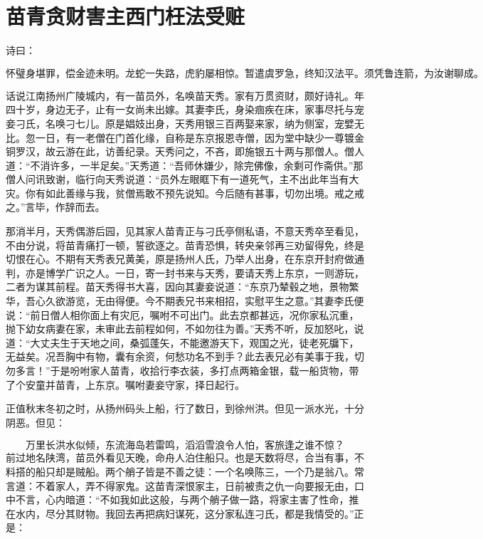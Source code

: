 

\chapter{苗青贪财害主\KG 西门枉法受赃}


诗曰：

\[
怀璧身堪罪，偿金迹未明。龙蛇一失路，虎豹屡相惊。
暂遣虞罗急，终知汉法平。须凭鲁连箭，为汝谢聊成。
\]

话说江南扬州广陵城内，有一苗员外，名唤苗天秀。家有万贯资财，颇好诗礼。年四十岁，身边无子，止有一女尚未出嫁。其妻李氏，身染痼疾在床，家事尽托与宠妾刁氏，名唤刁七儿。原是娼妓出身，天秀用银三百两娶来家，纳为侧室，宠嬖无比。忽一日，有一老僧在门首化缘，自称是东京报恩寺僧，因为堂中缺少一尊镀金铜罗汉，故云游在此，访善纪录。天秀问之，不吝，即施银五十两与那僧人。僧人道：“不消许多，一半足矣。”天秀道：“吾师休嫌少，除完佛像，余剩可作斋供。”那僧人问讯致谢，临行向天秀说道：“员外左眼眶下有一道死气，主不出此年当有大灾。你有如此善缘与我，贫僧焉敢不预先说知。今后随有甚事，切勿出境。戒之戒之。”言毕，作辞而去。

那消半月，天秀偶游后园，见其家人苗青正与刁氏亭侧私语，不意天秀卒至看见，不由分说，将苗青痛打一顿，誓欲逐之。苗青恐惧，转央亲邻再三劝留得免，终是切恨在心。不期有天秀表兄黄美，原是扬州人氏，乃举人出身，在东京开封府做通判，亦是博学广识之人。一日，寄一封书来与天秀，要请天秀上东京，一则游玩，二者为谋其前程。苗天秀得书大喜，因向其妻妾说道：“东京乃辇毂之地，景物繁华，吾心久欲游览，无由得便。今不期表兄书来相招，实慰平生之意。”其妻李氏便说：“前日僧人相你面上有灾厄，嘱咐不可出门。此去京都甚远，况你家私沉重，抛下幼女病妻在家，未审此去前程如何，不如勿往为善。”天秀不听，反加怒叱，说道：“大丈夫生于天地之间，桑弧蓬矢，不能邀游天下，观国之光，徒老死牖下，无益矣。况吾胸中有物，囊有余资，何愁功名不到手？此去表兄必有美事于我，切勿多言！”于是吩咐家人苗青，收拾行李衣装，多打点两箱金银，载一船货物，带了个安童并苗青，上东京。嘱咐妻妾守家，择日起行。

正值秋末冬初之时，从扬州码头上船，行了数日，到徐州洪。但见一派水光，十分阴恶。但见：

\[
万里长洪水似倾，东流海岛若雷鸣，
滔滔雪浪令人怕，客旅逢之谁不惊？
\]
前过地名陕湾，苗员外看见天晚，命舟人泊住船只。也是天数将尽，合当有事，不料搭的船只却是贼船。两个艄子皆是不善之徒：一个名唤陈三，一个乃是翁八。常言道：不着家人，弄不得家鬼。这苗青深恨家主，日前被责之仇一向要报无由，口中不言，心内暗道：“不如我如此这般，与两个艄子做一路，将家主害了性命，推在水内，尽分其财物。我回去再把病妇谋死，这分家私连刁氏，都是我情受的。”正是：

